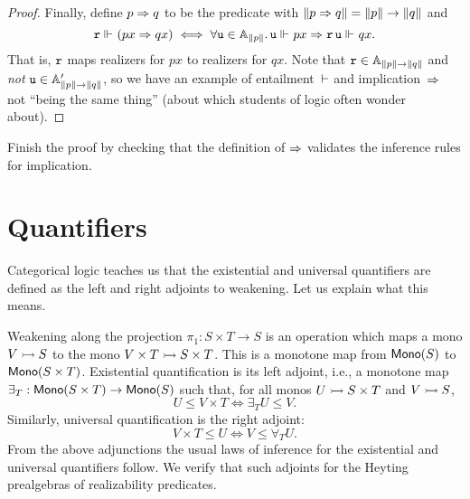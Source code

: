 \begin{proof}
  Finally, define $p \Rightarrow q$ to be the predicate with $\|p \Rightarrow q\| = \|p\| \to \|q\|$ and
  \begin{equation*}
    \mathtt{r} \Vdash_{} (p x \Rightarrow q x)
    \iff
      \forall \mathtt{u} \in \mathbb{A}_{\|p\|} .\,
        \mathtt{u} \Vdash_{} p x
        \Rightarrow
        \mathtt{r}\,\mathtt{u} \Vdash_{} q x.
  \end{equation*}
  That is, $\mathtt{r}$ maps realizers for $p x$ to realizers for $q x$.
  Note that $\mathtt{r} \in \mathbb{A}_{\|p\| \to \|q\|}$ and \emph{not} $\mathtt{u} \in \mathbb{A}'_{\|p\| \to \|q\|}$, so we have an example of entailment~$\vdash$ and implication~$\Rightarrow$ not ``being the same thing'' (about which students of logic often wonder about).
\end{proof}

\begin{exercise}
  Finish the proof by checking that the definition of $\Rightarrow$ validates the inference rules for implication.
\end{exercise}

\section{Quantifiers}
\label{sec:quantifiers}

Categorical logic teaches us that the existential and universal quantifiers are defined as the left and right adjoints to weakening. Let us explain what this means.

Weakening along the projection $\pi_1 : S \times T \to S$ is an operation which maps a
mono $V \rightarrowtail S$ to the mono $V \times T \rightarrowtail S \times T$. This is a monotone map
from $\mathsf{Mono}(S)$ to $\mathsf{Mono}(S \times T)$. Existential quantification is its left adjoint,
i.e., a monotone map $\exists_{T} : \mathsf{Mono}(S \times T) \to \mathsf{Mono}(S)$ such that, for all
monos $U \rightarrowtail S \times T$ and $V \rightarrowtail S$,
%
\begin{equation*}
  U \leq V \times T
  \iff
  \exists_{T} U \leq V.
\end{equation*}
%
Similarly, universal quantification is the right adjoint:
%
\begin{equation*}
  V \times T \leq U
  \iff
  V \leq \forall_{T} U.
\end{equation*}
%
From the above adjunctions the usual laws of inference for the existential and universal quantifiers follow. We verify that such adjoints for the Heyting prealgebras of realizability predicates.

